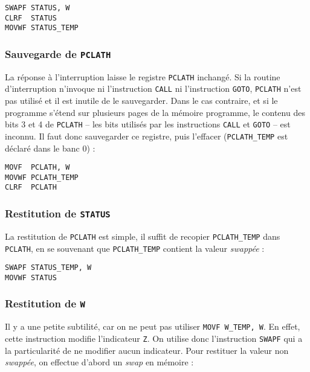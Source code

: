\begin{lstlisting}[language=assembleur]
SWAPF STATUS, W
CLRF  STATUS
MOVWF STATUS_TEMP 
\end{lstlisting}

\subsubsection{Sauvegarde de \texttt{PCLATH}}

La réponse à l'interruption laisse le registre \texttt{PCLATH} inchangé. Si la routine d'interruption n'invoque ni l'instruction \texttt{CALL} ni l'instruction \texttt{GOTO}, \texttt{PCLATH} n'est pas utilisé et il est inutile de le sauvegarder. Dans le cas contraire, et si le programme s'étend sur plusieurs pages de la mémoire programme, le contenu des bits 3 et 4 de \texttt{PCLATH} -- les bits utilisés par les instructions \texttt{CALL} et \texttt{GOTO} -- est inconnu. Il faut donc sauvegarder ce registre, puis l'effacer (\texttt{PCLATH\_TEMP} est déclaré dans le banc 0) :

\begin{lstlisting}[language=assembleur]
MOVF  PCLATH, W
MOVWF PCLATH_TEMP 
CLRF  PCLATH
\end{lstlisting}




\subsubsection{Restitution de \texttt{STATUS}}

La restitution de \texttt{PCLATH} est simple, il suffit de recopier \texttt{PCLATH\_TEMP} dans \texttt{PCLATH}, en se souvenant que \texttt{PCLATH\_TEMP} contient la valeur \emph{swappée} :

\begin{lstlisting}[language=assembleur]
SWAPF STATUS_TEMP, W
MOVWF STATUS
\end{lstlisting}


\subsubsection{Restitution de \texttt{W}}

Il y a une petite subtilité, car on ne peut pas utiliser \texttt{MOVF W\_TEMP, W}. En effet, cette instruction modifie l'indicateur \texttt{Z}. On utilise donc l'instruction \texttt{SWAPF} qui a la particularité de ne modifier aucun indicateur. Pour restituer la valeur non \emph{swappée}, on effectue d'abord un \emph{swap} en mémoire :

